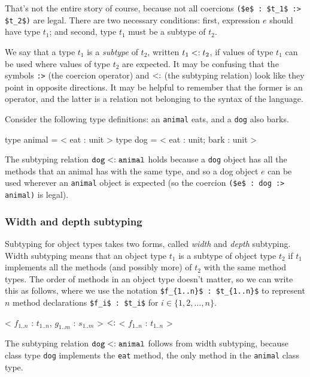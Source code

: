 
That's not the entire story of course, because not all coercions \hbox{\lstinline/($e$ : $t_1$ :> $t_2$)/}
are legal.  There are two necessary conditions: first, expression $e$ should have type $t_1$; and
second, type $t_1$ must be a subtype of $t_2$.

We say that a type $t_1$ is a \emph{subtype} of $t_2$, written $t_1 \mathrel{\hbox{<:}} t_2$, if values of type
$t_1$ can be used where values of type $t_2$ are expected.  It may be confusing that the
symbols \hbox{\lstinline$:>$} (the coercion operator) and $\mathrel{\hbox{<:}}$ (the
subtyping relation) look like they point in opposite directions.  It may be
helpful to remember that the former is an operator, and the latter is
a relation not belonging to the syntax of the language.

Consider the following type definitions: an \hbox{\lstinline/animal/} eats, and a \hbox{\lstinline/dog/} also
barks.

\begin{ocaml}
type animal = < eat : unit >
type dog = < eat : unit; bark : unit >
\end{ocaml}
%
The subtyping relation $\texttt{dog} \mathrel{\hbox{<:}} \texttt{animal}$ holds because a \hbox{\lstinline$dog$} object
has all the methods that an animal has with the same type, and so a dog object $e$ can be used wherever
an \hbox{\lstinline$animal$} object is expected (so the coercion \hbox{\lstinline/($e$ : dog :> animal)/} is legal).

\subsubsection{Width and depth subtyping}
\label{section:width-subtyping}

Subtyping for object types takes two forms, called \emph{width} and \emph{depth} subtyping.  Width
subtyping means that an object type $t_1$ is a subtype of object type $t_2$ if $t_1$ implements all
the methods (and possibly more) of $t_2$ with the same method types.  The order of methods in an
object type doesn't matter, so we can write this as follows, where we use the
notation \hbox{\lstinline/$f_{1..n}$ : $t_{1..n}$/} to represent $n$ method
declarations \hbox{\lstinline/$f_i$ : $t_i$/} for $i \in \{ 1, 2, \ldots, n \}$.

\begin{ocaml}
< $f_{1..n}$ : $t_{1..n}$, $g_{1..m}$ : $s_{1..m}$ > $\mathrel{\hbox{<:}}$ < $f_{1..n}$ : $t_{1..n}$ >
\end{ocaml}
%
The subtyping relation $\texttt{dog} \mathrel{\hbox{<:}} \texttt{animal}$ follows from width subtyping, because class
type \hbox{\lstinline$dog$} implements the \hbox{\lstinline$eat$} method, the only method in
the \hbox{\lstinline$animal$} class type.

